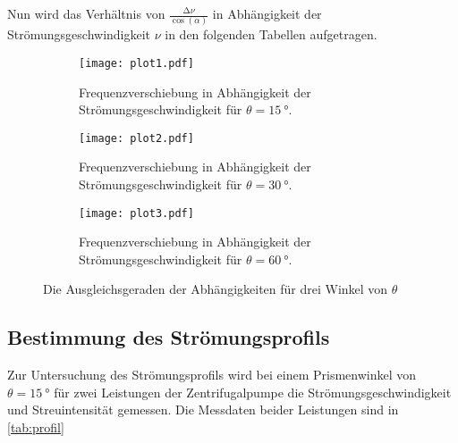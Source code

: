 Nun wird das Verhältnis von $\frac{\increment \nu}{\cos (\alpha)}$ in Abhängigkeit der Strömungsgeschwindigkeit
$\nu$ in den folgenden Tabellen aufgetragen.
\begin{figure}
  \centering
  
  \begin{subfigure}{0.65\columnwidth}
    \centering
    \texttt{[image: plot1.pdf]}
    \caption{Frequenzverschiebung in Abhängigkeit der Strömungsgeschwindigkeit für $\theta = \qty{15}{°}$.}
    \label{fig:w15}
  \end{subfigure}
  
  \medskip
  
  \begin{subfigure}{0.65\columnwidth}
    \centering
    \texttt{[image: plot2.pdf]}
    \caption{Frequenzverschiebung in Abhängigkeit der Strömungsgeschwindigkeit für $\theta = \qty{30}{°}$.}
    \label{fig:w30}
  \end{subfigure}
  
  \medskip
  
  \begin{subfigure}{0.65\columnwidth}
    \centering
    \texttt{[image: plot3.pdf]}
    \caption{Frequenzverschiebung in Abhängigkeit der Strömungsgeschwindigkeit für $\theta = \qty{60}{°}$.}
    \label{fig:w60}
  \end{subfigure}

  \caption{Die Ausgleichsgeraden der Abhängigkeiten für drei Winkel von $\theta$}
  \label{fig:winkel}
\end{figure}


\subsection{Bestimmung des Strömungsprofils}

Zur Untersuchung des Strömungsprofils wird bei einem Prismenwinkel von $\theta = \qty{15}{°}$
für zwei Leistungen der Zentrifugalpumpe die Strömungsgeschwindigkeit und Streuintensität gemessen.
Die Messdaten beider Leistungen sind in \autoref{tab:profil}

